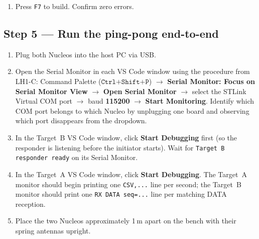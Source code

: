 \documentclass[11pt,letterpaper]{article}
\begin{document}
\begin{enumerate}[leftmargin=2em]
\begin{verbatim}
                /* --- Build and TX ACK echoing the DATA's seq --- */
                uint8_t ack[32];
                build_packet(ack, BEACON_ID_B, rx_seq,
                             PKT_TYPE_ACK, MOD_KIND_LORA);

                rfm_set_mode_standby();
                rfm_write_reg(0x0D, rfm_read_reg(0x0E));
                for (int i = 0; i < 32; i++) {
                    rfm_write_reg(0x00, ack[i]);
                }
                rfm_write_reg(0x22, 32);
                rfm_write_reg(0x12, 0xFF);
                rfm_write_reg(0x01, 0x83);  /* LoRa TX */

                /* Wait for TxDone */
                do {
                    irq = rfm_read_reg(0x12);
                } while ((irq & 0x08) == 0);
                rfm_write_reg(0x12, 0xFF);

                acks_sent++;

                /* Return to RXCONTINUOUS for next DATA */
                rfm_set_mode_rx();
            }
        }
    }
    /* USER CODE END WHILE */

    /* USER CODE BEGIN 3 */
}
/* USER CODE END 3 */
\end{verbatim}

	\item Press \texttt{F7} to build. Confirm zero errors.
\end{enumerate}

\newpage
\subsection{Step 5 --- Run the ping-pong end-to-end}
\begin{enumerate}[leftmargin=2em]
	\item Plug both Nucleos into the host PC via USB.
	\item Open the Serial Monitor in each VS Code window using the procedure from LH1-C: Command Palette ($\texttt{Ctrl+Shift+P}$) $\to$ \textbf{Serial Monitor: Focus on Serial Monitor View} $\to$ \textbf{Open Serial Monitor} $\to$ select the STLink Virtual COM port $\to$ baud \textbf{115200} $\to$ \textbf{Start Monitoring}. Identify which COM port belongs to which Nucleo by unplugging one board and observing which port disappears from the dropdown.
	\item In the Target~B VS Code window, click \textbf{Start Debugging} first (so the responder is listening before the initiator starts). Wait for \texttt{Target B responder ready} on its Serial Monitor.
	\item In the Target~A VS Code window, click \textbf{Start Debugging}. The Target~A monitor should begin printing one \texttt{CSV,...} line per second; the Target~B monitor should print one \texttt{RX DATA seq=...} line per matching DATA reception.
	\item Place the two Nucleos approximately 1\,m apart on the bench with their spring antennas upright.
\end{enumerate}
\end{document}
